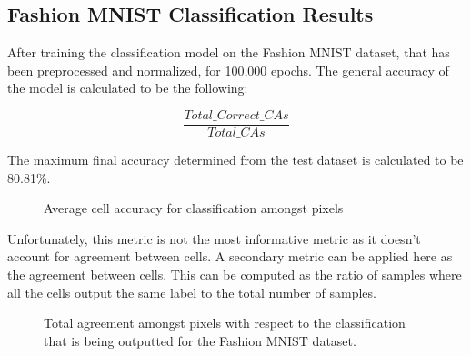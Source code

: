 \documentclass[conference]{IEEEtran}
\begin{document}
\subsection{Fashion MNIST Classification Results}

After training the classification model on the Fashion MNIST dataset, that has been preprocessed and normalized, for 100,000 epochs. The general accuracy of the model is calculated to be the following:

\begin{equation}
    \frac{Total\_Correct\_CAs} {Total\_CAs}
\end{equation}

The maximum final accuracy determined from the test dataset is calculated to be 80.81\%.

\begin{figure}[htbp]
\caption{Average cell accuracy for classification amongst pixels}
\end{figure}


Unfortunately, this metric is not the most informative metric as it doesn't account for agreement between cells. A secondary metric can be applied here as the agreement between cells. This can be computed as the ratio of samples where all the cells output the same label to the total number of samples.

\begin{figure}[htbp]
\caption{ Total agreement amongst pixels with respect to the classification that is being outputted for the Fashion MNIST dataset.}
\end{figure}
\end{document}

